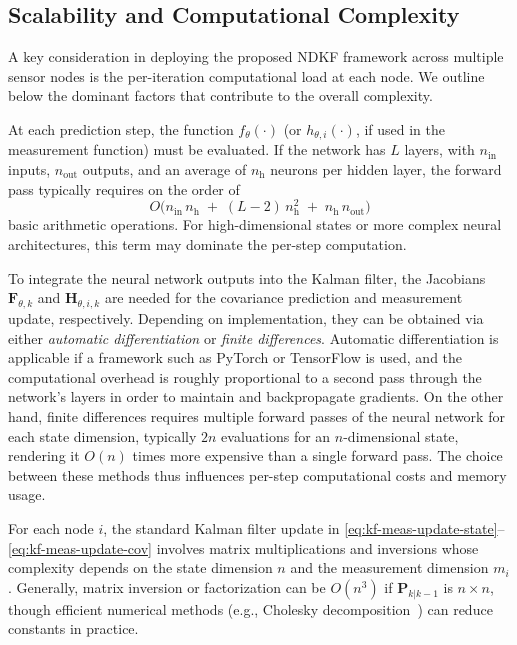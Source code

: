 \documentclass[letterpaper, 10 pt, conference]{ieeeconf}
\begin{document}
\subsection{Scalability and Computational Complexity}
\label{sec:computational-complexity}

A key consideration in deploying the proposed NDKF framework across multiple sensor nodes is the per-iteration computational load at each node. We outline below the dominant factors that contribute to the overall complexity.

At each prediction step, the function $f_{\theta}(\cdot)$ (or $h_{\theta,i}(\cdot)$, if used in the measurement function) must be evaluated. If the network has $L$ layers, with $n_\mathrm{in}$ inputs, $n_\mathrm{out}$ outputs, and an average of $n_\mathrm{h}$ neurons per hidden layer, the forward pass typically requires on the order of
\begin{equation}
    O\bigl(n_\mathrm{in} \, n_\mathrm{h} \;+\; (L-2) \, n_\mathrm{h}^2 \;+\; n_\mathrm{h} \, n_\mathrm{out}\bigr)
\end{equation}
basic arithmetic operations. For high-dimensional states or more complex neural architectures, this term may dominate the per-step computation.

To integrate the neural network outputs into the Kalman filter, the Jacobians $\mathbf{F}_{\theta,k}$ and $\mathbf{H}_{\theta,i,k}$ are needed for the covariance prediction and measurement update, respectively. Depending on implementation, they can be obtained via either \emph{automatic differentiation} or \emph{finite differences}.
Automatic differentiation is applicable if a framework such as PyTorch or TensorFlow is used, and the computational overhead is roughly proportional to a second pass through the network’s layers in order to maintain and backpropagate gradients.
On the other hand, finite differences requires multiple forward passes of the neural network for each state dimension, typically $2n$ evaluations for an $n$-dimensional state, rendering it $O(n)$ times more expensive than a single forward pass.
The choice between these methods thus influences per-step computational costs and memory usage.

For each node $i$, the standard Kalman filter update in \eqref{eq:kf-meas-update-state}--\eqref{eq:kf-meas-update-cov} involves matrix multiplications and inversions whose complexity depends on the state dimension $n$ and the measurement dimension $m_i$. Generally, matrix inversion or factorization can be $O(n^3)$ if $\mathbf{P}_{k|k-1}$ is $n\times n$, though efficient numerical methods (e.g., Cholesky decomposition~\cite{Krishnamoorthy2013}) can reduce constants in practice.
\end{document}
